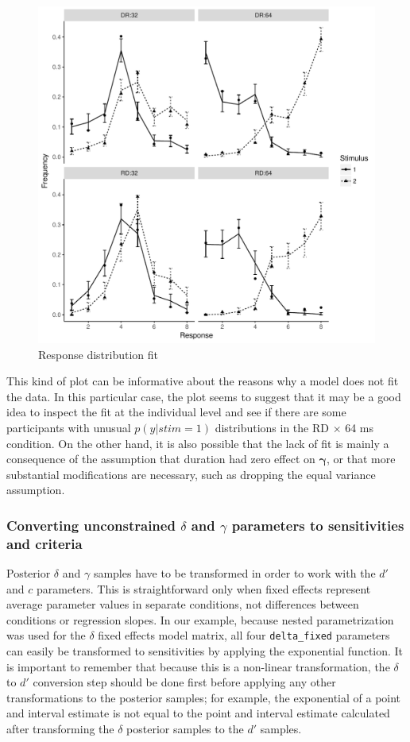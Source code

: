 \documentclass[a4paper,man,apacite,floatsintext]{apa6}
\newcommand{\code}[1]{\texttt{#1}}
\begin{document}
\begin{figure}[H]
  \centering
  \includegraphics[width=.8\linewidth]{response_fit.pdf}
  \caption{Response distribution fit}
  \label{fig:4}
\end{figure}

This kind of plot can be informative about the reasons why a model
does not fit the data. In this particular case, the plot seems to
suggest that it may be a good idea to inspect the fit at the
individual level and see if there are some participants with unusual
$p(y|stim=1)$ distributions in the RD $\times$ 64 ms condition. On the
other hand, it is also possible that the lack of fit is mainly a
consequence of the assumption that duration had zero effect on
$\bm{\gamma}$, or that more substantial modifications are necessary,
such as dropping the equal variance assumption.

\subsubsection{Converting unconstrained $\delta$ and $\gamma$
  parameters to sensitivities and criteria}

Posterior $\delta$ and $\gamma$ samples have to be transformed in
order to work with the $d'$ and $c$ parameters. This is
straightforward only when fixed effects represent average parameter
values in separate conditions, not differences between conditions or
regression slopes. In our example, because nested parametrization was
used for the $\delta$ fixed effects model matrix, all four
\code{delta\_fixed} parameters can easily be transformed to
sensitivities by applying the exponential function. It is important to
remember that because this is a non-linear transformation, the
$\delta$ to $d'$ conversion step should be done first before applying
any other transformations to the posterior samples; for example, the
exponential of a point and interval estimate is not equal to the point
and interval estimate calculated after transforming the $\delta$
posterior samples to the $d'$ samples.
\end{document}
